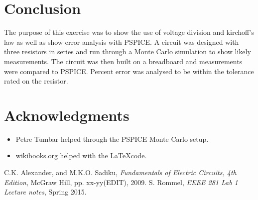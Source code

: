 \documentclass[11pt]{article}
\begin{document}

\pagebreak

\section{Conclusion}

The purpose of this exercise was to show the use of voltage division and kirchoff's law as well as show error analysis with PSPICE. A circuit was designed with three resistors in series and run through a Monte Carlo simulation to show likely measurements. The circuit was then built on a breadboard and measurements were compared to PSPICE. Percent error was analysed to be within the tolerance rated on the resistor.
	
	\section{Acknowledgments}
	\begin{itemize}
	\item Petre Tumbar helped through the PSPICE Monte Carlo setup.
	\item wikibooks.org helped with the \LaTeX\;code.
	\end{itemize}
	
\begin{thebibliography}{9}
	C.K. Alexander, and M.K.O. Sadiku,
	\emph{Fundamentals of Electric Circuits, 4th Edition},
	McGraw Hill, pp. xx-yy(EDIT), 2009.
	S. Rommel,
	\emph{EEEE 281 Lab 1 Lecture notes}, Spring 2015.
\end{thebibliography}
\end{document}
